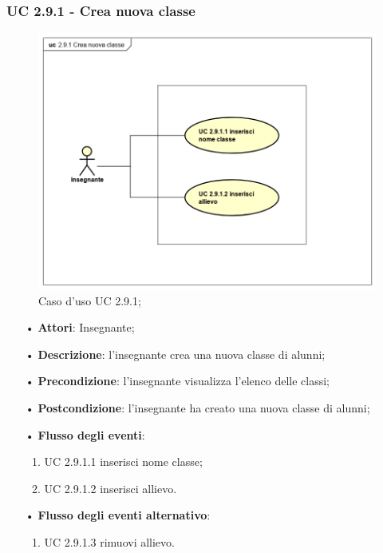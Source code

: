 \subsubsection{UC 2.9.1 - Crea nuova classe}
\begin{figure}[H]
	\centering
	\includegraphics[width=17cm]{img/Crea_nuova_classe.png} 
	\caption{Caso d'uso UC 2.9.1;}
\end{figure}

\begin{itemize}
	\item[•] \textbf{Attori}: Insegnante;
	\item[•] \textbf{Descrizione}: l'insegnante crea una nuova classe di alunni;
	\item[•] \textbf{Precondizione}: l'insegnante visualizza l'elenco delle classi;
	\item[•] \textbf{Postcondizione}: l'insegnante ha creato una nuova classe di alunni;
	\item[•] \textbf{Flusso degli eventi}:
	\begin{enumerate}
		\item UC 2.9.1.1 inserisci nome classe;
		\item UC 2.9.1.2 inserisci allievo.
	\end{enumerate}
	\item[•] \textbf{Flusso degli eventi alternativo}:
	\begin{enumerate}
		\item UC 2.9.1.3 rimuovi allievo.
	\end{enumerate}
\end{itemize}

